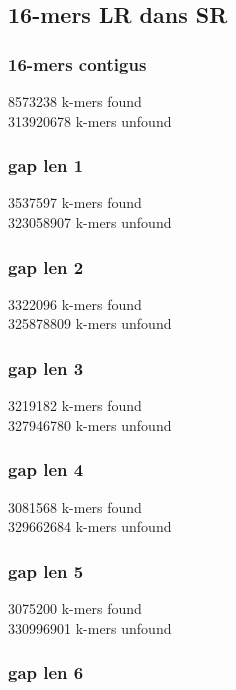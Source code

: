 \documentclass[12pt]{article}
\begin{document}
\subsection{16-mers LR dans SR}

\subsubsection{16-mers contigus}

8573238 k-mers found \\
313920678 k-mers unfound

\subsubsection{gap len 1}

3537597 k-mers found \\
323058907 k-mers unfound

\subsubsection{gap len 2}

3322096 k-mers found \\
325878809 k-mers unfound

\subsubsection{gap len 3}

3219182 k-mers found \\
327946780 k-mers unfound

\subsubsection{gap len 4}

3081568 k-mers found \\
329662684 k-mers unfound

\subsubsection{gap len 5}

3075200 k-mers found \\
330996901 k-mers unfound

\subsubsection{gap len 6}
\end{document}
